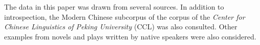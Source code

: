 The data in this paper was drawn from several sources.
In addition to introspection, the Modern Chinese subcorpus of the corpus of the \textit{Center for Chinese Linguistics of Peking University} ({CCL}) \citep{Zhanetal2003, Zhanetal2019} was also consulted. 
Other examples from novels and plays written by native speakers were also considered.